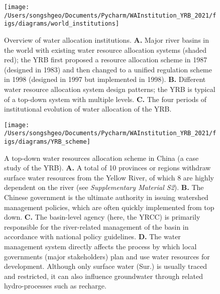 \begin{figure}[!htb]
    \centering
    \texttt{[image: /Users/songshgeo/Documents/Pycharm/WAInstitution\_YRB\_2021/figs/diagrams/world\_institutions]}
	\caption{
		Overview of water allocation institutions.
		\textbf{A.} Major river basins in the world with existing water resource allocation systems (shaded red); the YRB first proposed a resource allocation scheme in 1987 (designed in 1983) and then changed to a unified regulation scheme in 1998 (designed in 1997 but implemented in 1998).
		\textbf{B.} Different water resource allocation system design patterns; the YRB is typical of a top-down system with multiple levels.
		\textbf{C.} The four periods of institutional evolution of water allocation of the YRB.
	}
    \label{fig:world}
\end{figure}

\begin{figure}[!htb]
    \centering
	\texttt{[image: /Users/songshgeo/Documents/Pycharm/WAInstitution\_YRB\_2021/figs/diagrams/YRB\_scheme]}
	\caption{
		A top-down water resources allocation scheme in China (a case study of the YRB).
		\textbf{A.} A total of 10 provinces or regions withdraw surface water resources from the Yellow River, of which 8 are highly dependent on the river (see \textit{Supplementary Material S2}).
		\textbf{B.} The Chinese government is the ultimate authority in issuing watershed management policies, which are often quickly implemented from top down.
		\textbf{C.} The basin-level agency (here, the YRCC) is primarily responsible for the river-related management of the basin in accordance with national policy guidelines.
		\textbf{D.} The water management system directly affects the process by which local governments (major stakeholders) plan and use water resources for development. Although only surface water (Sur.) is usually traced and restricted, it can also influence groundwater through related hydro-processes such as recharge.
	}
	\label{fig:framework}
\end{figure}
